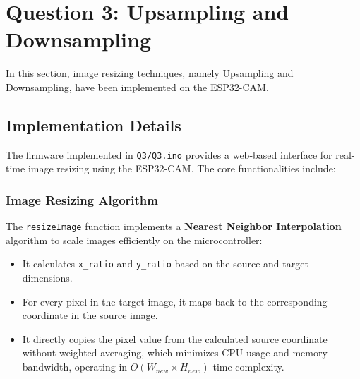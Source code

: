 \section{Question 3: Upsampling and Downsampling}

In this section, image resizing techniques, namely Upsampling and Downsampling, have been implemented on the ESP32-CAM.

\subsection{Implementation Details}
The firmware implemented in \texttt{Q3/Q3.ino} provides a web-based interface for real-time image resizing using the ESP32-CAM. The core functionalities include:

\subsubsection{Image Resizing Algorithm}
The \texttt{resizeImage} function implements a \textbf{Nearest Neighbor Interpolation} algorithm to scale images efficiently on the microcontroller:
\begin{itemize}
    \item It calculates \texttt{x\_ratio} and \texttt{y\_ratio} based on the source and target dimensions.
    \item For every pixel in the target image, it maps back to the corresponding coordinate in the source image.
    \item It directly copies the pixel value from the calculated source coordinate without weighted averaging, which minimizes CPU usage and memory bandwidth, operating in $O(W_{new} \times H_{new})$ time complexity.
\end{itemize}

